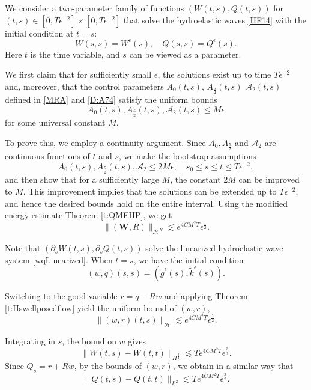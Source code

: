 \documentclass[12pt]{amsart}
\theoremstyle{remark}
\theoremstyle{definition}
\numberwithin{equation}{section}
\newcommand{\e}{\epsilon}
\renewcommand{\H}{{\mathcal H }}
\newcommand{\f}{\frac}
\begin{document}
We consider a two-parameter family of functions $(W(t,s), Q(t,s))$ for $(t,s) \in [0, T\e^{-2}]\times [0, T\e^{-2}]$ that solve the hydroelastic waves \eqref{HF14} with the initial condition at $t = s$:
\begin{equation*}
    W(s,s) = W^\e(s), \quad Q(s,s) = Q^\e(s).
\end{equation*}
Here $t$ is the time variable, and $s$ can be viewed as a parameter.

We first claim that for sufficiently small $\epsilon$, the solutions exist up to time $T\epsilon^{-2}$ and, moreover, that the control parameters $A_0(t,s)$, $A_{\f52}(t,s)$ $\mathcal{A}_{2}(t,s)$ defined in \eqref{MRA} and \eqref{D:A74} satisfy the uniform bounds
\[A_0(t,s), A_{\f52}(t,s), \mathcal{A}_{2}(t, s)\leq M\epsilon\] for some universal constant $M$.

To prove this, we employ a continuity argument. 
Since $A_0, A_{\f52}$ and $\mathcal{A}_{2}$ are continuous functions of $t$ and $s$, we make the bootstrap assumptions
\[A_0(t,s), A_{\f52}(t,s),\mathcal{A}_{2} \leq 2M\epsilon, \quad s_0 \leq s \leq t \leq T\epsilon^{-2},\]
and then show that for a sufficiently large $M$, the constant $2M$ can be improved to $M$.
This improvement implies that the solutions can be extended up to $T\epsilon^{-2}$, and hence the desired bounds hold on the entire interval.
Using the modified energy estimate Theorem \ref{t:QMEHP}, we get
\begin{equation} \label{WREnergyBound}
 \|(\mathbf{W}, R)\|_{\H^N} \lesssim e^{4CM^2T}\epsilon^\f12.
\end{equation}

Note that $(\partial_s W(t,s), \partial_s Q(t,s))$ solve the linearized hydroelastic wave system \eqref{wqLinearized}. 
When $t = s$, we have the initial condition
\[
(w,q)(s,s) = (\tilde{g}^\e(s), \tilde{k}^\e(s)).
\]

Switching to the good variable $r = q - Rw$ and applying Theorem \ref{t:Hswellposedflow} yield the uniform bound of $(w,r)$,
\[
\|(w,r)(t,s)\|_{\H} \lesssim e^{4CM^2T} \epsilon^{\frac{7}{2}}.
\]

Integrating in $s$, the bound on $w$ gives
\begin{equation}\label{Ws-t}
\|W(t,s)-W(t,t)\|_{H^{\f32}} \lesssim T e^{4CM^2T} \epsilon^{\frac{3}{2}}.  
\end{equation}
Since $Q_s=r+Rw$, by the bounds of $(w, r)$, we obtain in a similar way that
\begin{equation}\label{Qs-t}
\|Q(t,s)-Q(t,t)\|_{L^2} \lesssim T e^{4CM^2T} \epsilon^{\frac{3}{2}}.  
\end{equation}
\end{document}
